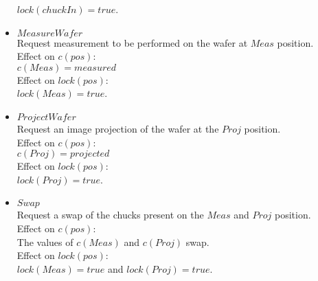 \begin{itemize}
$lock(chuckIn) = true$.\\
\item $MeasureWafer$
\\Request measurement to be performed on the wafer at $Meas$ position.\\
Effect on $c(pos)$:\\
$c(Meas) = measured$\\
Effect on $lock(pos)$:\\
$lock(Meas) = true$.\\
\item $ProjectWafer$
\\Request an image projection of the wafer at the $Proj$ position.\\
Effect on $c(pos)$:\\
$c(Proj) = projected$\\
Effect on $lock(pos)$:\\
$lock(Proj) = true$.\\
\item $Swap$
\\Request a swap of the chucks present on the $Meas$ and $Proj$ position.\\
Effect on $c(pos)$:\\
The values of $c(Meas)$ and $c(Proj)$ swap.\\
Effect on $lock(pos)$:\\
$lock(Meas) = true$ and $lock(Proj) = true$.\\
\end{itemize}

